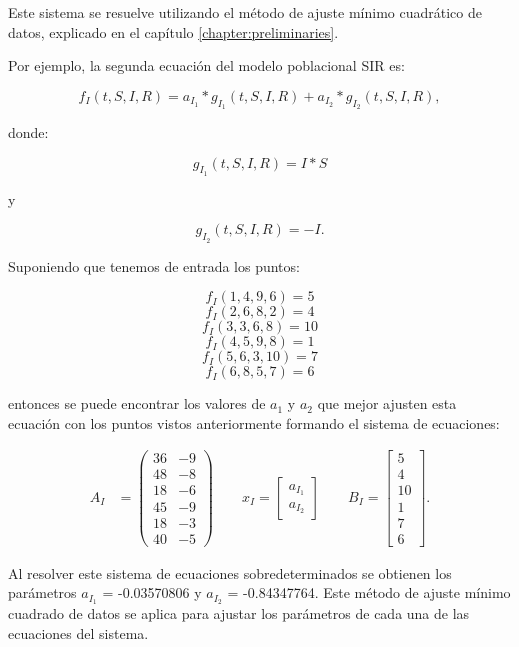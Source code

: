 Este sistema se resuelve utilizando el método de ajuste mínimo cuadrático de datos, explicado en el capítulo \ref{chapter:preliminaries}.

Por ejemplo, la segunda ecuación del modelo poblacional SIR es:

$$f_I (t,S,I,R) = a_{I_1} * g_{I_1}(t,S,I,R) + a_{I_2} * g_{I_2}(t,S,I,R),$$

donde:

$$g_{I_1}(t,S,I,R) = I*S$$

y

$$g_{I_2}(t,S,I,R) = -I.$$

Suponiendo que tenemos de entrada los puntos:

$$f_I(1, 4, 9, 6) = 5 $$
$$f_I(2, 6, 8, 2) = 4 $$
$$f_I(3, 3, 6, 8) = 10$$
$$f_I(4, 5, 9, 8) = 1 $$
$$f_I(5, 6, 3, 10) =7 $$
$$f_I(6, 8, 5, 7) = 6 $$

entonces se puede encontrar los valores de $a_1$ y $a_2$ que mejor ajusten esta ecuación con los puntos vistos anteriormente formando el sistema de ecuaciones:

\begin{align*}
    A_I & = \begin{pmatrix}
        36 & -9 \\
        48 & -8 \\
        18 & -6 \\
        45 & -9 \\
        18 & -3 \\
        40 & -5
    \end{pmatrix}
    \qquad
    x_I = \begin{bmatrix}
        a_{I_1} \\
        a_{I_2}
    \end{bmatrix}
    \qquad
    B_I = \begin{bmatrix}
        5  \\
        4  \\
        10 \\
        1  \\
        7  \\
        6
    \end{bmatrix}.
\end{align*}

Al resolver este sistema de ecuaciones sobredeterminados se obtienen los parámetros $a_{I_1}$ = -0.03570806 y $a_{I_2}$ = -0.84347764. Este método de ajuste mínimo cuadrado de datos se aplica para ajustar los parámetros de cada una de las ecuaciones del sistema.


